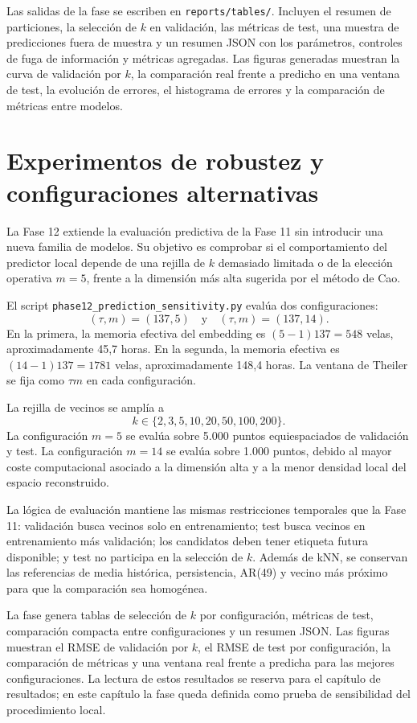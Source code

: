 Las salidas de la fase se escriben en \texttt{reports/\allowbreak tables/}. Incluyen el resumen de particiones, la selección de \(k\) en validación, las métricas de test, una muestra de predicciones fuera de muestra y un resumen JSON con los parámetros, controles de fuga de información y métricas agregadas. Las figuras generadas muestran la curva de validación por \(k\), la comparación real frente a predicho en una ventana de test, la evolución de errores, el histograma de errores y la comparación de métricas entre modelos.

\section{Experimentos de robustez y configuraciones alternativas}\label{sec:experimentos-robustez}

La Fase 12 extiende la evaluación predictiva de la Fase 11 sin introducir una nueva familia de modelos. Su objetivo es comprobar si el comportamiento del predictor local depende de una rejilla de \(k\) demasiado limitada o de la elección operativa \(m=5\), frente a la dimensión más alta sugerida por el método de Cao.

El script \texttt{phase12\_\allowbreak prediction\_\allowbreak sensitivity.py} evalúa dos configuraciones:
\[
    (\tau,m)=(137,5)
    \quad\text{y}\quad
    (\tau,m)=(137,14).
\]
En la primera, la memoria efectiva del embedding es \((5-1)137=548\) velas, aproximadamente 45,7 horas. En la segunda, la memoria efectiva es \((14-1)137=1781\) velas, aproximadamente 148,4 horas. La ventana de Theiler se fija como \(\tau m\) en cada configuración.

La rejilla de vecinos se amplía a
\[
    k \in \{2,3,5,10,20,50,100,200\}.
\]
La configuración \(m=5\) se evalúa sobre 5.000 puntos equiespaciados de validación y test. La configuración \(m=14\) se evalúa sobre 1.000 puntos, debido al mayor coste computacional asociado a la dimensión alta y a la menor densidad local del espacio reconstruido.

La lógica de evaluación mantiene las mismas restricciones temporales que la Fase 11: validación busca vecinos solo en entrenamiento; test busca vecinos en entrenamiento más validación; los candidatos deben tener etiqueta futura disponible; y test no participa en la selección de \(k\). Además de kNN, se conservan las referencias de media histórica, persistencia, AR(49) y vecino más próximo para que la comparación sea homogénea.

La fase genera tablas de selección de \(k\) por configuración, métricas de test, comparación compacta entre configuraciones y un resumen JSON. Las figuras muestran el RMSE de validación por \(k\), el RMSE de test por configuración, la comparación de métricas y una ventana real frente a predicha para las mejores configuraciones. La lectura de estos resultados se reserva para el capítulo de resultados; en este capítulo la fase queda definida como prueba de sensibilidad del procedimiento local.

